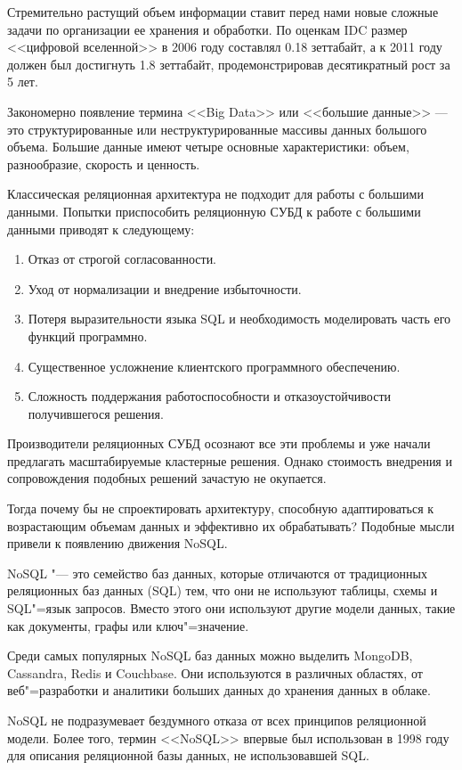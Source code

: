 Стремительно растущий объем информации ставит перед нами новые сложные задачи по организации ее хранения и обработки.
По оценкам IDC размер <<цифровой вселенной>> в 2006 году составлял 0.18 зеттабайт, а к 2011 году должен был достигнуть 1.8 зеттабайт, продемонстрировав десятикратный рост за 5 лет. 

Закономерно появление термина <<Big Data>> или <<большие данные>> — это структурированные или неструктурированные массивы данных большого объема. Большие данные имеют четыре основные характеристики: объем, разнообразие, скорость и ценность. 

Классическая реляционная архитектура не подходит для работы с большими данными. Попытки приспособить реляционную СУБД к работе с большими данными приводят к следующему:

\begin{enumerate}
    \item Отказ от строгой согласованности.
    \item Уход от нормализации и внедрение избыточности.
    \item Потеря выразительности языка SQL и необходимость моделировать часть его функций программно.
    \item Существенное усложнение клиентского программного обеспечению.
    \item Сложность поддержания работоспособности и отказоустойчивости получившегося решения.
\end{enumerate}

Производители реляционных СУБД осознают все эти проблемы и уже начали предлагать масштабируемые
кластерные решения. Однако стоимость внедрения и сопровождения подобных решений зачастую не окупается.

Тогда почему бы не спроектировать архитектуру,
способную адаптироваться к возрастающим объемам данных и эффективно их
обрабатывать? Подобные мысли привели к появлению движения NoSQL.

NoSQL "--- это семейство баз данных, которые отличаются от традиционных реляционных баз данных (SQL) тем, что они не используют таблицы, схемы и SQL"=язык запросов. Вместо этого они используют другие модели данных, такие как документы, графы или ключ"=значение.  

Среди самых популярных NoSQL баз данных можно выделить MongoDB, Cassandra, Redis и Couchbase. Они используются в различных областях, от веб"=разработки и аналитики больших данных до хранения данных в облаке.

NoSQL не подразумевает бездумного отказа от всех принципов реляционной модели. Более того, термин <<NoSQL>>
впервые был использован в 1998 году для описания реляционной базы данных, не использовавшей SQL. 


